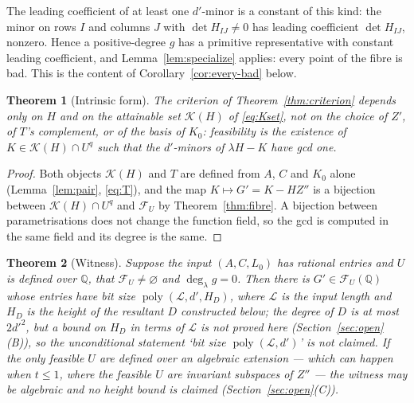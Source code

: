 \documentclass[journal]{IEEEtran}
\theoremstyle{plainn}
\newtheorem{thm}{Theorem}
\theoremstyle{remark}
\begin{document}
The leading coefficient of at least one $d'$-minor is a constant of this kind: the minor on rows $I$
and columns $J$ with $\det H_{IJ}\ne0$ has leading coefficient $\det H_{IJ}$, nonzero. Hence a
positive-degree $g$ has a primitive representative with constant leading coefficient, and
Lemma~\ref{lem:specialize} applies: every point of the fibre is bad. This is the content of
Corollary~\ref{cor:every-bad} below.

\begin{thm}[Intrinsic form]\label{thm:intrinsic}
The criterion of Theorem~\ref{thm:criterion} depends only on $H$ and on the attainable set
$\mathcal K(H)$ of \eqref{eq:Kset}, not on the choice of $Z'$, of $T$'s complement, or of the basis
of $K_0$: feasibility is the existence of $K\in\mathcal K(H)\cap U^{q}$ such that the $d'$-minors of
$\lambda H-K$ have gcd one.
\end{thm}

\begin{proof}
Both objects $\mathcal K(H)$ and $T$ are defined from $A$, $C$ and $K_0$ alone
(Lemma~\ref{lem:pair}, \eqref{eq:T}), and the map $K\mapsto G'=K-HZ''$ is a bijection between
$\mathcal K(H)\cap U^{q}$ and $\mathcal F_U$ by Theorem~\ref{thm:fibre}. A bijection between
parametrisations does not change the function field, so the gcd is computed in the same field and its
degree is the same.
\end{proof}

\begin{thm}[Witness]\label{thm:witness}
Suppose the input $(A,C,L_0)$ has rational entries and $U$ is defined over $\mathbb Q$, that
$\mathcal F_U\ne\varnothing$ and $\deg_\lambda g=0$. Then there is $G'\in\mathcal F_U(\mathbb Q)$ whose
entries have bit size $\operatorname{poly}(\mathcal L,d',H_D)$, where $\mathcal L$ is the input length and
$H_D$ is the height of the resultant $D$ constructed below; the degree of $D$ is at most $2d'^{2}$, but a
bound on $H_D$ in terms of $\mathcal L$ is \emph{not} proved here (Section~\ref{sec:open}(B)), so the
unconditional statement `bit size $\operatorname{poly}(\mathcal L,d')$' is not claimed. If the
only feasible $U$ are defined over an algebraic extension --- which can happen when $t\le1$, where the
feasible $U$ are invariant subspaces of $Z''$ --- the witness may be algebraic and no height bound is
claimed (Section~\ref{sec:open}(C)).
\end{thm}
\end{document}
